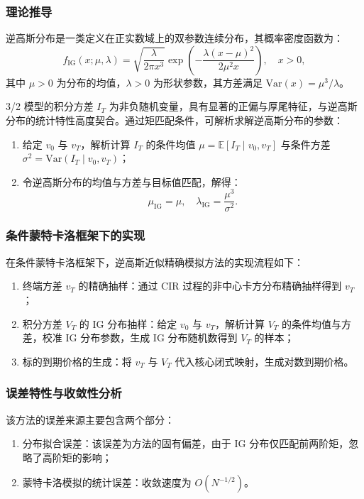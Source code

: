 \subsubsection{理论推导}
逆高斯分布是一类定义在正实数域上的双参数连续分布，其概率密度函数为：
\begin {equation}
  f_{\text {IG}}(x; \mu, \lambda) = \sqrt {\frac {\lambda}{2\pi x^3}} \exp\left ( -\frac {\lambda (x-\mu)^2}{2\mu^2 x} \right), \quad x > 0,
\end {equation}
其中 $\mu > 0$ 为分布的均值，$\lambda > 0$ 为形状参数，其方差满足 $\mathrm{Var}(x) = \mu^3/\lambda$。

3/2 模型的积分方差 $I_T$ 为非负随机变量，具有显著的正偏与厚尾特征，与逆高斯分布的统计特性高度契合。通过矩匹配条件，可解析求解逆高斯分布的参数：
\begin{enumerate}
    \item 给定 $v_0$ 与 $v_T$，解析计算 $I_T$ 的条件均值 $\mu = \mathbb{E}[I_T \mid v_0, v_T]$ 与条件方差 $\sigma^2 = \mathrm{Var}(I_T \mid v_0, v_T)$；
    
    \item 令逆高斯分布的均值与方差与目标值匹配，解得：
    \begin{equation}
        \mu_{\text{IG}} = \mu, \quad \lambda_{\text{IG}} = \frac{\mu^3}{\sigma^2}.
    \end{equation}
\end{enumerate}

\subsubsection{条件蒙特卡洛框架下的实现}
在条件蒙特卡洛框架下，逆高斯近似精确模拟方法的实现流程如下：
\begin{enumerate}
    \item 终端方差 $v_T$ 的精确抽样：通过 CIR 过程的非中心卡方分布精确抽样得到 $v_T$；
    \item 积分方差 $V_T$ 的 IG 分布抽样：给定 $v_0$ 与 $v_T$，解析计算 $V_T$ 的条件均值与方差，校准 IG 分布参数，生成 IG 分布随机数得到 $V_T$ 的样本；
    \item 标的到期价格的生成：将 $v_T$ 与 $V_T$ 代入核心闭式映射，生成对数到期价格。
\end{enumerate}

\subsubsection{误差特性与收敛性分析}
该方法的误差来源主要包含两个部分：
\begin{enumerate}
    \item 分布拟合误差：该误差为方法的固有偏差，由于 IG 分布仅匹配前两阶矩，忽略了高阶矩的影响；
    \item 蒙特卡洛模拟的统计误差：收敛速度为 $O(N^{-1/2})$。
\end{enumerate}

